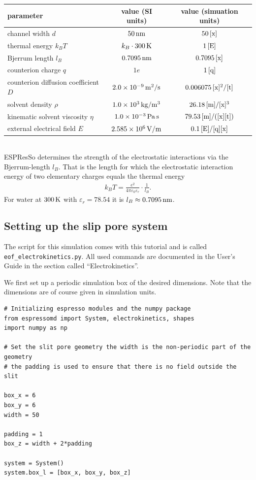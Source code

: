 \begin{tabular}[h]{|l|c|c|}
\hline
parameter & value (SI units) & value (simuation units)\\
\hline\hline
channel width $d$ & $50\,\mathrm{nm}$ & $50\,\mathrm{[x]}$\\
\hline
thermal energy $k_B T$ & $k_B\cdot300\,\mathrm{K}$ & $1\,\mathrm{[E]}$\\
\hline
Bjerrum length $l_B$ & $0.7095\,\mathrm{nm}$ & $0.7095\,\mathrm{[x]}$\\
\hline
counterion charge $q$ & $1e$ & $1\,\mathrm{[q]}$\\
\hline
counterion diffusion coefficient $D$ & $2.0\times 10^{-9}\,\mathrm{m^2/s}$ & $0.006075\,\mathrm{[x]^2/[t]}$\\
\hline
solvent density $\rho$ & $1.0\times 10^{3}\,\mathrm{kg/m^3}$ & $26.18\,\mathrm{[m]/[x]^3}$\\
\hline
kinematic solvent viscosity $\eta$ & $1.0\times 10^{-3}\,\mathrm{Pa}\,\mathrm{s}$ & $79.53\,\mathrm{[m]/([x][t])}$\\
\hline
external electrical field $E$ & $2.585\times 10^{6}\,\mathrm{V/m}$ & $0.1\,\mathrm{[E]/[q][x]}$\\
\hline
\end{tabular}
\\

ESPResSo determines the strength of the electrostatic interactions via the Bjerrum-length $l_B$. That is the length for which the electrostatic interaction energy of two elementary charges equals the thermal energy
%
\begin{align*}
k_B T=\frac{e^2}{4\pi\varepsilon_0\varepsilon_r}\cdot\frac 1 {l_B}.
\end{align*}
%
For water at $300\,\mathrm{K}$ with $\varepsilon_r = 78.54$ it is $l_B\approx0.7095\,\mathrm{nm}$.


\subsection{Setting up the slip pore system}

The script for this simulation comes with this tutorial and is called \texttt{eof\_electrokinetics.py}. All used commands are documented in the User's Guide in the section called ``Electrokinetics''.

We first set up a periodic simulation box of the desired dimensions. Note that the dimensions are of course given in simulation units.

\begin{lstlisting}
# Initializing espresso modules and the numpy package
from espressomd import System, electrokinetics, shapes
import numpy as np

# Set the slit pore geometry the width is the non-periodic part of the geometry
# the padding is used to ensure that there is no field outside the slit

box_x = 6
box_y = 6
width = 50

padding = 1
box_z = width + 2*padding

system = System()
system.box_l = [box_x, box_y, box_z]
\end{lstlisting}

